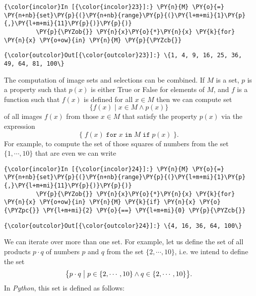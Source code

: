     \begin{Verbatim}[commandchars=\\\{\}]
{\color{incolor}In [{\color{incolor}23}]:} \PY{n}{M} \PY{o}{=} \PY{n+nb}{set}\PY{p}{(}\PY{n+nb}{range}\PY{p}{(}\PY{l+m+mi}{1}\PY{p}{,}\PY{l+m+mi}{11}\PY{p}{)}\PY{p}{)}
         \PY{p}{\PYZob{}} \PY{n}{x}\PY{o}{*}\PY{n}{x} \PY{k}{for} \PY{n}{x} \PY{o+ow}{in} \PY{n}{M} \PY{p}{\PYZcb{}}
\end{Verbatim}


\begin{Verbatim}[commandchars=\\\{\}]
{\color{outcolor}Out[{\color{outcolor}23}]:} \{1, 4, 9, 16, 25, 36, 49, 64, 81, 100\}
\end{Verbatim}
            
The computation of image sets and selections can be combined. If \(M\)
is a set, \(p\) is a property such that \(p(x)\) is either True or False
for elements of \(M\), and \(f\) is a function such that \(f(x)\) is
defined for all \(x \in M\) then we can compute set
\[ \{ f(x) \mid  x \in M \wedge p(x) \} \] of all images \(f(x)\) from
those \(x\in M\) that satisfy the property \(p(x)\) via the expression
\[ \{\; f(x)\; \texttt{for}\; x\; \texttt{in}\; M\; \texttt{if}\; p(x)\; \}. \]
For example, to compute the set of those squares of numbers from the set
\(\{1,\cdots,10\}\) that are even we can write

    \begin{Verbatim}[commandchars=\\\{\}]
{\color{incolor}In [{\color{incolor}24}]:} \PY{n}{M} \PY{o}{=} \PY{n+nb}{set}\PY{p}{(}\PY{n+nb}{range}\PY{p}{(}\PY{l+m+mi}{1}\PY{p}{,}\PY{l+m+mi}{11}\PY{p}{)}\PY{p}{)}
         \PY{p}{\PYZob{}} \PY{n}{x}\PY{o}{*}\PY{n}{x} \PY{k}{for} \PY{n}{x} \PY{o+ow}{in} \PY{n}{M} \PY{k}{if} \PY{n}{x} \PY{o}{\PYZpc{}} \PY{l+m+mi}{2} \PY{o}{==} \PY{l+m+mi}{0} \PY{p}{\PYZcb{}}
\end{Verbatim}


\begin{Verbatim}[commandchars=\\\{\}]
{\color{outcolor}Out[{\color{outcolor}24}]:} \{4, 16, 36, 64, 100\}
\end{Verbatim}
            
We can iterate over more than one set. For example, let us define the
set of all products \(p \cdot q\) of numbers \(p\) and \(q\) from the
set \(\{2, \cdots, 10\}\), i.e. we intend to define the set
\[ \bigl\{ p \cdot q \bigm| p \in \{2,\cdots,10\} \wedge q \in \{2,\cdots,10\} \bigr\}. \]
In \textsl{Python}, this set is defined as follows:

